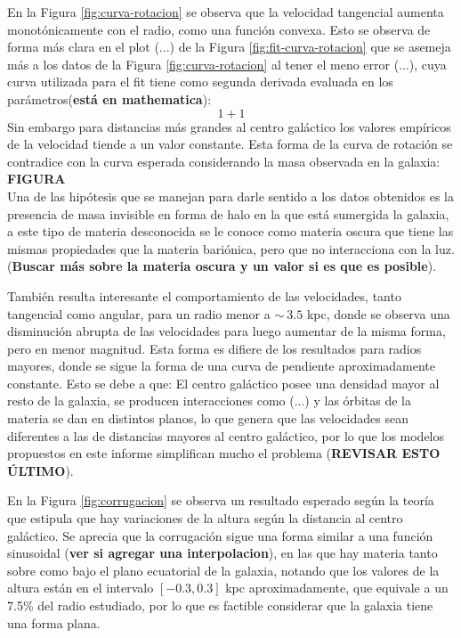 \documentclass[letterpaper,oneside]{article}
\begin{document}
En la Figura \ref{fig:curva-rotacion} se observa que la velocidad tangencial aumenta monotónicamente con el radio, como una función convexa. Esto se observa de forma más clara en el plot (...) de la Figura \ref{fig:fit-curva-rotacion} que se asemeja más a los datos de la Figura \ref{fig:curva-rotacion} al tener el meno error (...), cuya curva utilizada para el fit tiene como segunda derivada evaluada en los parámetros(\textbf{está en mathematica}):
\[
1+1
\]
Sin embargo para distancias más grandes al centro galáctico los valores empíricos de la velocidad tiende a un valor constante. Esta forma de la curva de rotación se contradice con la curva esperada considerando la masa observada en la galaxia:\\

\textbf{FIGURA}\\

Una de las hipótesis que se manejan para darle sentido a los datos obtenidos es la presencia de masa invisible en forma de halo en la que está sumergida la galaxia, a este tipo de materia desconocida se le conoce como materia oscura que tiene las mismas propiedades que la materia bariónica, pero que no interacciona con la luz. (\textbf{Buscar más sobre la materia oscura y un valor si es que es posible}).

También resulta interesante el comportamiento de las velocidades, tanto tangencial como angular, para un radio menor a $\sim \ 3.5$ kpc, donde se observa una disminución abrupta de las velocidades para luego aumentar de la misma forma, pero en menor magnitud. Esta forma es difiere de los resultados para radios mayores, donde se sigue la forma de una curva de pendiente aproximadamente constante. Esto se debe a que: El centro galáctico posee una densidad mayor al resto de la galaxia, se producen interacciones como (...) y las órbitas de la materia se dan en distintos planos, lo que genera que las velocidades sean diferentes a las de distancias mayores al centro galáctico, por lo que los modelos propuestos en este informe simplifican mucho el problema (\textbf{REVISAR ESTO ÚLTIMO}).

En la Figura \ref{fig:corrugacion} se observa un resultado esperado según la teoría que estipula que hay variaciones de la altura según la distancia al centro galáctico. Se aprecia que la corrugación sigue una forma similar a una función sinusoidal (\textbf{ver si agregar una interpolacion}), en las que hay materia tanto sobre como bajo el plano ecuatorial de la galaxia, notando que los valores de la altura están en el intervalo $[-0.3,0.3]$ kpc aproximadamente, que equivale a un 7.5\% del radio estudiado, por lo que es factible considerar que la galaxia tiene una forma plana.
\end{document}
